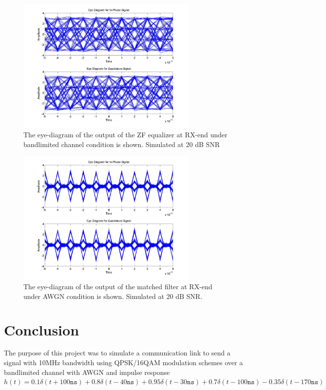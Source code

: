 \documentclass[]{article}
\begin{document}
\begin{figure}[H]
\centering
\includegraphics[width=0.8\textwidth]{equalized_eye_qam20.jpg}
\caption{The eye-diagram of the output of the ZF equalizer at RX-end under bandlimited channel condition is shown. Simulated at 20 dB SNR \label{fig:qamEyeEqu}}
\end{figure}

\begin{figure}[H]
\centering
\includegraphics[width=0.8\textwidth]{awgn_eye_qam20.jpg}
\caption{ The eye-diagram of the output of the matched filter at RX-end under AWGN condition is shown. Simulated at 20 dB SNR.\label{fig:qpEyeAWGN}}
\end{figure}

\newpage
\section{Conclusion}
\label{sec:conc}

The purpose of this project was to simulate a communication link to send a signal with 10MHz bandwidth using QPSK/16QAM modulation schemes over a bandlimited channel with AWGN and impulse response  $h(t) = 0.1\delta(t + 100 \mathtt{ns}) + 0.8\delta(t -40 \mathtt{ns}) + 0.95\delta(t - 30 \mathtt{ns}) + 0.7\delta(t - 100 \mathtt{ns}) - 0.35\delta(t - 170 \mathtt{ns}) $
\end{document}
